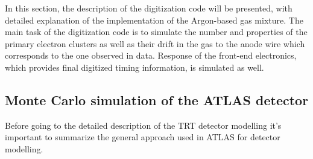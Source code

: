 In this section, the description of the digitization code will be presented, with detailed explanation of the implementation of the Argon-based gas mixture.
The main task of the digitization code is to simulate the number and properties of the primary electron clusters as well as their drift in the gas to the anode wire which corresponds to the one observed in data. 
Response of the front-end electronics, which provides final digitized timing information, is simulated as well. 

\subsection{Monte Carlo simulation of the ATLAS detector}

Before going to the detailed description of the TRT detector modelling it's important to summarize the
general approach used in ATLAS for detector modelling.

